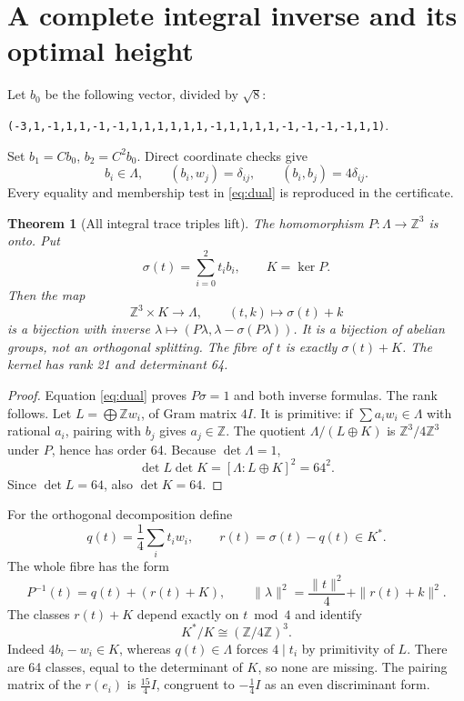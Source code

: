 \documentclass[11pt,reqno]{amsart}
\newtheorem{theorem}{Theorem}[section]
\theoremstyle{definition}\newtheorem{definition}[theorem]{Definition}
\theoremstyle{remark}\newtheorem{remark}[theorem]{Remark}
\newcommand{\Z}{\mathbb Z}\newcommand{\Q}{\mathbb Q}\newcommand{\R}{\mathbb R}\newcommand{\F}{\mathbb F}
\newcommand{\La}{\Lambda}\newcommand{\tr}{\operatorname{tr}}\newcommand{\Span}{\operatorname{span}}
\begin{document}
\section{A complete integral inverse and its optimal height}
Let $b_0$ be the following vector, divided by $\sqrt8$:
\begin{center}\small
\texttt{(-3,1,-1,1,1,-1,-1,1,1,1,1,1,1,-1,1,1,1,1,-1,-1,-1,-1,1,1)}.
\end{center}
Set $b_1=Cb_0$, $b_2=C^2b_0$. Direct coordinate checks give
\begin{equation}\label{eq:dual}
b_i\in\La,\qquad (b_i,w_j)=\delta_{ij},\qquad (b_i,b_j)=4\delta_{ij}.
\end{equation}
Every equality and membership test in \eqref{eq:dual} is reproduced in the certificate.

\begin{theorem}[All integral trace triples lift]\label{thm:inverse}
The homomorphism $P:\La\to\Z^3$ is onto. Put
\[
\sigma(t)=\sum_{i=0}^2t_i b_i,\qquad K=\ker P.
\]
Then the map
\[
\Z^3\times K\longrightarrow\La,\qquad(t,k)\longmapsto\sigma(t)+k
\]
is a bijection with inverse $\lambda\mapsto(P\lambda,\lambda-\sigma(P\lambda))$. It is a bijection of abelian groups, not an orthogonal splitting. The fibre of $t$ is exactly $\sigma(t)+K$. The kernel has rank 21 and determinant 64.
\end{theorem}
\begin{proof}
Equation \eqref{eq:dual} proves $P\sigma=1$ and both inverse formulas. The rank follows. Let $L=\bigoplus\Z w_i$, of Gram matrix $4I$. It is primitive: if $\sum a_iw_i\in\La$ with rational $a_i$, pairing with $b_j$ gives $a_j\in\Z$. The quotient $\La/(L\oplus K)$ is $\Z^3/4\Z^3$ under $P$, hence has order 64. Because $\det\La=1$,
\[
\det L\det K=[\La:L\oplus K]^2=64^2.
\]
Since $\det L=64$, also $\det K=64$.
\end{proof}
For the orthogonal decomposition define
\[
q(t)=\frac14\sum_i t_iw_i,\qquad r(t)=\sigma(t)-q(t)\in K^*.
\]
The whole fibre has the form
\begin{equation}\label{eq:orthofibre}
P^{-1}(t)=q(t)+(r(t)+K),\qquad
\|\lambda\|^2=\frac{\|t\|^2}{4}+\|r(t)+k\|^2.
\end{equation}
The classes $r(t)+K$ depend exactly on $t\bmod4$ and identify
\[
K^*/K\cong(\Z/4\Z)^3.
\]
Indeed $4b_i-w_i\in K$, whereas $q(t)\in\La$ forces $4\mid t_i$ by primitivity of $L$. There are 64 classes, equal to the determinant of $K$, so none are missing. The pairing matrix of the $r(e_i)$ is $\frac{15}{4}I$, congruent to $-\frac14I$ as an even discriminant form.
\end{document}
